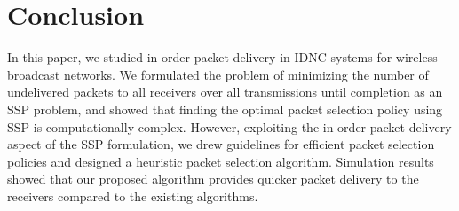 \documentclass[12pt, peerreview, onecolumn]{IEEEtran}
\begin{document}
\vspace{-5mm}
\section{Conclusion} \label{conclusion}
In this paper, we studied  in-order packet delivery  in  IDNC systems for  wireless broadcast networks.  We formulated the problem of  minimizing the  number of undelivered packets to all receivers over all transmissions until completion as  an SSP problem, and  showed that finding the optimal packet selection policy using SSP is computationally complex.  However, exploiting the in-order packet delivery aspect of the SSP formulation, we  drew  guidelines for   efficient  packet selection policies and  designed  a  heuristic packet selection algorithm.   Simulation results showed  that  our proposed   algorithm  provides quicker packet delivery  to the receivers compared to the  existing algorithms.

\vspace{-5mm}







\newpage
\end{document}
